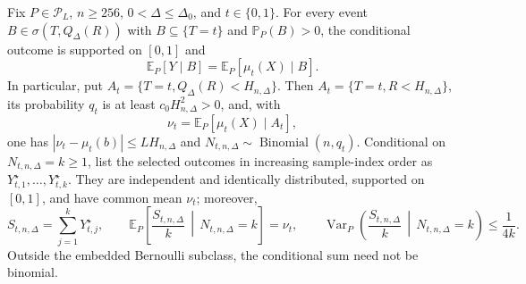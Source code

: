 Fix \(P\in\mathcal P_L\), \(n\geq256\), \(0<\Delta\leq\Delta_0\), and \(t\in\{0,1\}\).  For every event \(B\in\sigma(T,Q_\Delta(R))\) with \(B\subseteq\{T=t\}\) and \(\mathbb P_P(B)>0\), the conditional outcome is supported on \([0,1]\) and
\[
 \mathbb E_P[Y\mid B]=\mathbb E_P[\mu_t(X)\mid B].
\]
In particular, put \(A_t=\{T=t,Q_\Delta(R)<H_{n,\Delta}\}\).  Then \(A_t=\{T=t,R<H_{n,\Delta}\}\), its probability \(q_t\) is at least \(c_0H_{n,\Delta}^2>0\), and, with
\[
 \nu_t=\mathbb E_P[\mu_t(X)\mid A_t],
\]
one has \(|\nu_t-\mu_t(b)|\leq LH_{n,\Delta}\) and \(N_{t,n,\Delta}\sim\operatorname{Binomial}(n,q_t)\).  Conditional on \(N_{t,n,\Delta}=k\geq1\), list the selected outcomes in increasing sample-index order as \(Y_{t,1}^{\star},\ldots,Y_{t,k}^{\star}\).  They are independent and identically distributed, supported on \([0,1]\), and have common mean \(\nu_t\); moreover,
\[
 S_{t,n,\Delta}=\sum_{j=1}^kY_{t,j}^{\star},\qquad
 \mathbb E_P\!\left[\frac{S_{t,n,\Delta}}k\,\middle|\,N_{t,n,\Delta}=k\right]=\nu_t,
 \qquad
 \operatorname{Var}_P\!\left(\frac{S_{t,n,\Delta}}k\,\middle|\,N_{t,n,\Delta}=k\right)\leq\frac1{4k}.
\]
Outside the embedded Bernoulli subclass, the conditional sum need not be binomial.